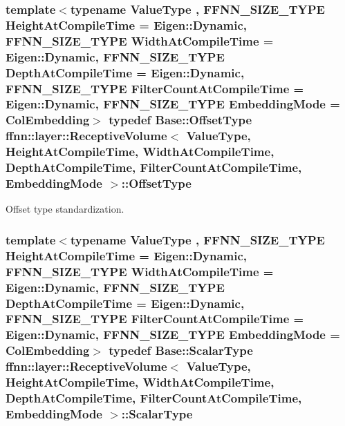 \hypertarget{classffnn_1_1layer_1_1_receptive_volume_a1844c5ef59193938758e778eb0530ba6}{
\subsubsection[{Offset\-Type}]{\setlength{\rightskip}{0pt plus 5cm}template$<$typename Value\-Type , F\-F\-N\-N\-\_\-\-S\-I\-Z\-E\-\_\-\-T\-Y\-P\-E Height\-At\-Compile\-Time = Eigen\-::\-Dynamic, F\-F\-N\-N\-\_\-\-S\-I\-Z\-E\-\_\-\-T\-Y\-P\-E Width\-At\-Compile\-Time = Eigen\-::\-Dynamic, F\-F\-N\-N\-\_\-\-S\-I\-Z\-E\-\_\-\-T\-Y\-P\-E Depth\-At\-Compile\-Time = Eigen\-::\-Dynamic, F\-F\-N\-N\-\_\-\-S\-I\-Z\-E\-\_\-\-T\-Y\-P\-E Filter\-Count\-At\-Compile\-Time = Eigen\-::\-Dynamic, F\-F\-N\-N\-\_\-\-S\-I\-Z\-E\-\_\-\-T\-Y\-P\-E Embedding\-Mode = Col\-Embedding$>$ typedef {\bf Base\-::\-Offset\-Type} {\bf ffnn\-::layer\-::\-Receptive\-Volume}$<$ Value\-Type, Height\-At\-Compile\-Time, Width\-At\-Compile\-Time, Depth\-At\-Compile\-Time, Filter\-Count\-At\-Compile\-Time, {\bf Embedding\-Mode} $>$\-::{\bf Offset\-Type}}}\label{classffnn_1_1layer_1_1_receptive_volume_a1844c5ef59193938758e778eb0530ba6}


Offset type standardization. 

\hypertarget{classffnn_1_1layer_1_1_receptive_volume_a4b3e846caf0136f173b3e0ceff912eac}{
\subsubsection[{Scalar\-Type}]{\setlength{\rightskip}{0pt plus 5cm}template$<$typename Value\-Type , F\-F\-N\-N\-\_\-\-S\-I\-Z\-E\-\_\-\-T\-Y\-P\-E Height\-At\-Compile\-Time = Eigen\-::\-Dynamic, F\-F\-N\-N\-\_\-\-S\-I\-Z\-E\-\_\-\-T\-Y\-P\-E Width\-At\-Compile\-Time = Eigen\-::\-Dynamic, F\-F\-N\-N\-\_\-\-S\-I\-Z\-E\-\_\-\-T\-Y\-P\-E Depth\-At\-Compile\-Time = Eigen\-::\-Dynamic, F\-F\-N\-N\-\_\-\-S\-I\-Z\-E\-\_\-\-T\-Y\-P\-E Filter\-Count\-At\-Compile\-Time = Eigen\-::\-Dynamic, F\-F\-N\-N\-\_\-\-S\-I\-Z\-E\-\_\-\-T\-Y\-P\-E Embedding\-Mode = Col\-Embedding$>$ typedef {\bf Base\-::\-Scalar\-Type} {\bf ffnn\-::layer\-::\-Receptive\-Volume}$<$ Value\-Type, Height\-At\-Compile\-Time, Width\-At\-Compile\-Time, Depth\-At\-Compile\-Time, Filter\-Count\-At\-Compile\-Time, {\bf Embedding\-Mode} $>$\-::{\bf Scalar\-Type}}}\label{classffnn_1_1layer_1_1_receptive_volume_a4b3e846caf0136f173b3e0ceff912eac}



